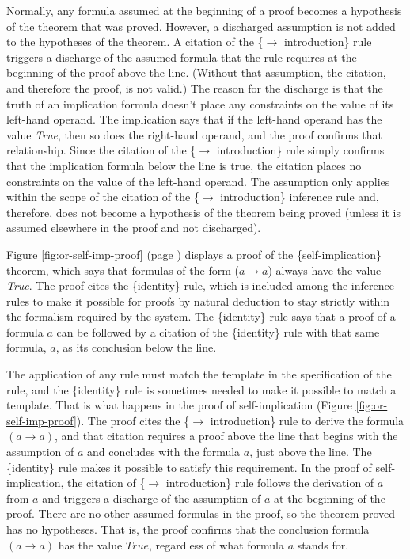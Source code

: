{Normally, any formula assumed at the beginning of a proof
becomes a hypothesis of the theorem that was proved.
However, a
discharged
assumption
is not added to the hypotheses of the theorem.
A citation of the
\{$\rightarrow$ introduction\} rule
triggers a discharge of the assumed formula that the
rule requires at the beginning of the proof above the line.
(Without that assumption, the citation,
and therefore the proof, is not valid.)
The reason for the discharge is that the truth of an implication
formula doesn't place any constraints on the value of its
left-hand operand.
The implication says that if the left-hand operand
has the value \emph{True}, then so does the right-hand operand,
and the proof confirms that relationship.
Since the citation of the
\{$\rightarrow$ introduction\} rule
simply confirms that the implication formula below the line
is true, the citation places no constraints on the value
of the left-hand operand.
The assumption only applies within the scope
of the citation of the \{$\rightarrow$ introduction\} inference rule
and, therefore, does not become a hypothesis of the theorem being proved
(unless it is assumed elsewhere in the proof and not discharged).

Figure \ref{fig:or-self-imp-proof} (page \pageref{fig:or-self-imp-proof})
displays a proof of the \{self-implication\} theorem,
which says that formulas of the form ($a \rightarrow a$) always have the value \emph{True}.
The proof cites the \{identity\} rule,
which is included among the inference rules to make it
possible for proofs by natural deduction to stay strictly
within the formalism required by the system.
The \{identity\} rule says that a proof of a formula $a$
can be followed by a citation of the \{identity\} rule
with that same formula, $a$, as its conclusion below the line.

The application of any rule must match
the template in the specification of the rule,
and the \{identity\} rule is sometimes needed to make it possible to match a template.
That is what happens in the proof of self-implication (Figure \ref{fig:or-self-imp-proof}).
The proof cites the \{$\rightarrow$ introduction\} rule
to derive the formula $(a \rightarrow a)$,
and that citation requires
a proof above the line that begins with the assumption of $a$
and concludes with the formula $a$, just above the line.
The \{identity\} rule makes it possible to satisfy this requirement.
In the proof of self-implication,
the citation of
\{$\rightarrow$ introduction\} rule
follows the derivation of $a$ from $a$ and triggers a
discharge
of the assumption of $a$ at the beginning of the proof.
There are no other assumed formulas in the proof,
so the theorem proved has no hypotheses.
That is, the proof confirms that the
conclusion formula
$(a \rightarrow a)$ has the value $True$, regardless of
what formula $a$ stands for.

}
